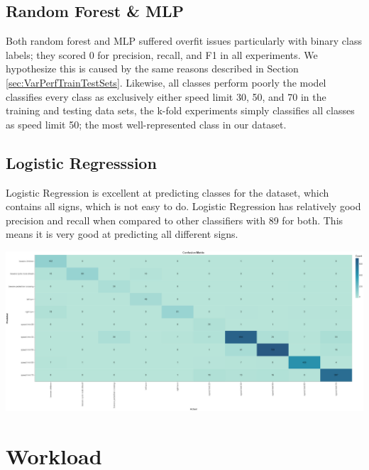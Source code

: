 \documentclass[11pt]{article}
\begin{document}
\subsection{Random Forest \& MLP}
Both random forest and MLP suffered overfit issues particularly with binary class labels; they scored 0 for precision, recall, and F1 in all experiments. We hypothesize this is caused by the same reasons described in Section \ref{sec:VarPerfTrainTestSets}. Likewise, all classes perform poorly the model classifies every class as exclusively either speed limit 30, 50, and 70 in the training and testing data sets, the k-fold experiments simply classifies all classes as speed limit 50; the most well-represented class in our dataset. 

\subsection{Logistic Regresssion}
Logistic Regression is excellent at predicting classes for the dataset, which contains all signs, which is not easy to do. Logistic Regression has relatively good precision and recall when compared to other classifiers with 89 for both. This means it is very good at predicting all different signs.

\begin{center}
  \includegraphics [width = \textwidth, height = 0.5\textheight, keepaspectratio]{Images/LRConfMat.png}
\end{center}

\pagebreak
\appendix
\appendixpage
\addappheadtotoc

\section{Workload}
\end{document}
